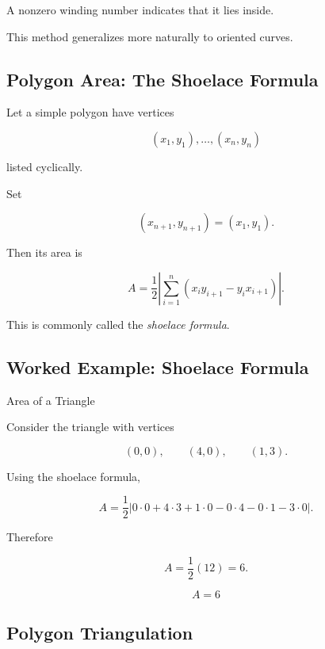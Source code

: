 A nonzero winding number indicates that it lies inside.

This method generalizes more naturally to oriented curves.

\subsection{Polygon Area: The Shoelace Formula}
\label{subsec:shoelace-formula}

Let a simple polygon have vertices

\[
(x_1,y_1),\ldots,(x_n,y_n)
\]

listed cyclically.

Set

\[
(x_{n+1},y_{n+1})=(x_1,y_1).
\]

Then its area is

\[
\boxed{
A
=
\frac12
\left|
\sum_{i=1}^{n}
(x_i y_{i+1}-y_i x_{i+1})
\right|.
}
\]

This is commonly called the \emph{shoelace formula}.

\subsection{Worked Example: Shoelace Formula}
\label{subsec:worked-shoelace}

\begin{workedexamplebox}{Area of a Triangle}

Consider the triangle with vertices

\[
(0,0),
\qquad
(4,0),
\qquad
(1,3).
\]

Using the shoelace formula,

\[
A
=
\frac12
\left|
0\cdot0
+
4\cdot3
+
1\cdot0
-
0\cdot4
-
0\cdot1
-
3\cdot0
\right|.
\]

Therefore

\[
A
=
\frac12(12)
=
6.
\]

\begin{answerbox}
\[
\boxed{A=6}
\]
\end{answerbox}
\end{workedexamplebox}

\subsection{Polygon Triangulation}
\label{subsec:computational-polygon-triangulation}

